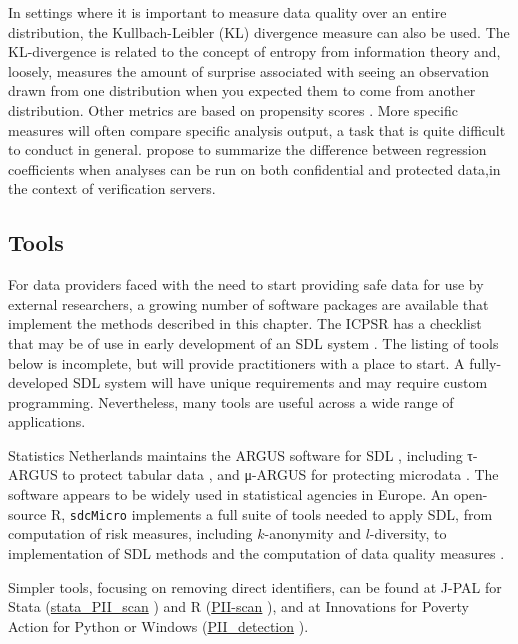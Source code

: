 \documentclass[
]{WileySix}
\begin{document}
In settings where it is important to measure data quality over an entire distribution, the Kullbach-Leibler (KL) divergence measure can also be used. The KL-divergence is related to the concept of entropy from information theory and, loosely, measures the amount of surprise associated with seeing an observation drawn from one distribution when you expected them to come from another distribution. Other metrics are based on propensity scores \citep{woo_global_2009, snoke_general_2018}. More specific measures will often compare specific analysis output, a task that is quite difficult to conduct in general. \citet{reiter_verification_2009} propose to summarize the difference between regression coefficients when analyses can be run on both confidential and protected data,in the context of verification servers.

\hypertarget{tools}{%
\subsection{Tools}\label{tools}}

For data providers faced with the need to start providing safe data for use by external researchers, a growing number of software packages are available that implement the methods described in this chapter. The ICPSR has a checklist that may be of use in early development of an SDL system \citep{icpsr_disclosure_2020}. The listing of tools below is incomplete, but will provide practitioners with a place to start. A fully-developed SDL system will have unique requirements and may require custom programming. Nevertheless, many tools are useful across a wide range of applications.

Statistics Netherlands maintains the ARGUS software for SDL \citep{hundepool_argus_1998}, including τ-ARGUS to protect tabular data \citep{de_wolf_-argus_2018}, and μ-ARGUS for protecting microdata \citep{hundepool_-argus_2018}. The software appears to be widely used in statistical agencies in Europe. An open-source R, \texttt{sdcMicro} implements a full suite of tools needed to apply SDL, from computation of risk measures, including \(k\)-anonymity and \(l\)-diversity, to implementation of SDL methods and the computation of data quality measures \citetext{\citealp[ ]{templ_statistical_2015}; \citealp{templ_sdcmicro_2020}}.

Simpler tools, focusing on removing direct identifiers, can be found at J-PAL for Stata (\href{https://github.com/J-PAL/stata_PII_scan}{stata\_PII\_scan} \citet{j-pal_j-palstata_pii_scan_2020}) and R (\href{https://github.com/J-PAL/PII-Scan}{PII-scan} \citet{j-pal_j-palpii-scan_2020}), and at Innovations for Poverty Action for Python or Windows (\href{https://github.com/PovertyAction/PII_detection}{PII\_detection} \citet{innovations_for_poverty_action_povertyactionpii_detection_2020}).
\end{document}
